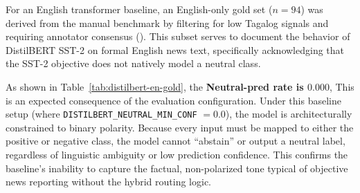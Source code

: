 \documentclass[sigconf, nonacm]{acmart}
\begin{document}
\begin{table}[h]
  \caption{VADER patch validation on the Tagalog/Taglish gold set ($n=130$).}
  \label{tab:vader-ph-gold}
  \centering
  \small
  \setlength{\tabcolsep}{3.5pt}
\end{table}

For an English transformer baseline, an English-only gold set ($n=94$) was derived from the manual benchmark by filtering for low Tagalog signals and requiring annotator consensus (). This subset serves to document the behavior of DistilBERT SST-2 on formal English news text, specifically acknowledging that the SST-2 objective does not natively model a neutral class.

As shown in Table~\ref{tab:distilbert-en-gold}, the \textbf{Neutral-pred rate is $0.000$}, This is an expected consequence of the evaluation configuration. Under this baseline setup (where \texttt{DISTILBERT\_NEUTRAL\_MIN\_CONF} $= 0.0$), the model is architecturally constrained to binary polarity. Because every input must be mapped to either the positive or negative class, the model cannot ``abstain'' or output a neutral label, regardless of linguistic ambiguity or low prediction confidence. This confirms the baseline’s inability to capture the factual, non-polarized tone typical of objective news reporting without the hybrid routing logic.

\begin{table}[h]
  \caption{DistilBERT SST-2 on an English-only gold set derived from the benchmark ($n=94$; binary positive vs.\ negative).}
  \label{tab:distilbert-en-gold}
  \centering
  \small
  \setlength{\tabcolsep}{3.5pt}
\end{table}
\end{document}
